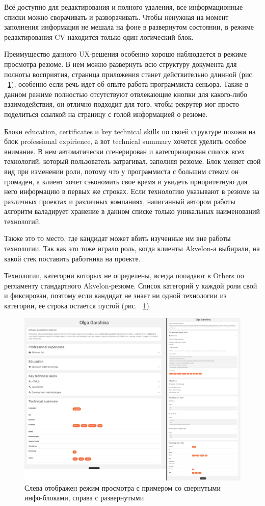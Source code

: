 \documentclass[12pt, a4paper]{diplom}
\begin{document}
Всё доступно для редактирования и полного удаления, все информационные списки можно сворачивать и разворачивать. Чтобы ненужная на момент заполнения информация не мешала на фоне в развернутом состоянии, в режиме редактирования CV находится
только один логический блок.

Преимущество данного UX-решения особенно хорошо наблюдается в режиме просмотра резюме. В нем можно развернуть всю структуру документа для полноты восприятия, страница приложения станет действительно длинной (рис. ~\ref{13}), особенно если речь идет об опыте работа программиста-сеньора.
Также в данном режиме полностью отсутствуют отвлекающие кнопки для какого-либо взаимодействия, он отлично подходит для того, чтобы рекрутер мог просто поделиться ссылкой на страницу с голой информацией о резюме.

Блоки education, certificates и key technical skills по своей структуре похожи на блок professional expirience, а вот technical summary хочется уделить особое внимание.
В нем автоматически сгенерирован и категоризирован список всех технологий, который пользователь затрагивал, заполняя резюме. Блок меняет свой вид при изменении роли, потому что у программиста с большим стеком он
громаден, а клиент хочет сэкономить свое время и увидеть приоритетную для него информацию в первых же строках. Если технологию указывают в резюме на различных проектах и различных компаниях, написанный автором работы алгоритм валадирует хранение в данном списке только уникальных наименований технологий.

Также это то место, где кандидат может вбить изученные им вне работы технологии. Так как это тоже играло роль, когда клиенты Akvelon-а выбирали, на какой стек поставить работника на проекте.

Технологии, категории которых не определены, всегда попадают в Others по регламенту стандартного Akvelon-резюме. Список категорий у каждой роли свой и фиксирован, поэтому если кандидат не знает ни одной технологии из категории, ее строка остается пустой (рис. ~\ref{13}).
\begin{figure}[!ht]
\centering
\includegraphics[width=1\textwidth]{resources/expand.png}
\caption{Слева отображен режим просмотра с примером со свернутыми инфо-блоками, справа с развернутыми}
\label{13}
\end{figure}
\end{document}
